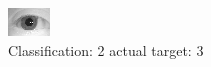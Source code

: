 \begin{figure}[h!]
\begin{center}
\includegraphics[width=0.60\columnwidth]{figures/ID1120_class_2_target_3.png}
\end{center}
\caption{ Classification: 2 actual target: 3}
\label{fig:ID1120_class_2_target_3}
\end{figure}

